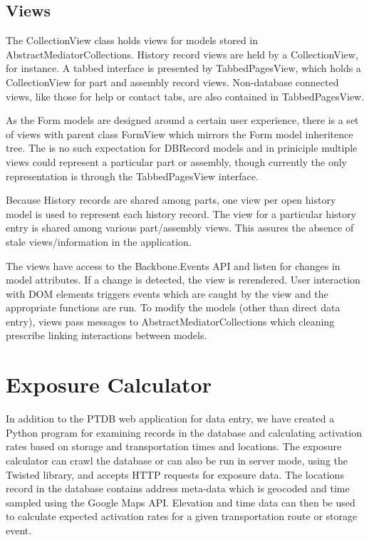 \documentclass[journal]{IEEEtran}
\begin{document}
\subsection{Views}

The CollectionView class holds views for models stored in AbstractMediatorCollections. History record 
views are held by a CollectionView, for instance. A tabbed interface is presented by TabbedPagesView,
which holds a CollectionView for part and assembly record views. Non-database connected views, like those
for help or contact tabs, are also contained in TabbedPagesView.

As the Form models are designed around a certain user experience, there is a set of views with parent class
FormView which mirrors the Form model inheritence tree. The is no such expectation for DBRecord models and
in priniciple multiple views could represent a particular part or assembly, though currently the only representation is
through the TabbedPagesView interface.

Because History records are shared among parts, one view per open history model is used to represent each history
record. The view for a particular history entry is shared among various part/assembly views. This assures the absence of
stale views/information in the application.

The views have access to the Backbone.Events API and listen for changes in model attributes. If a change is detected,
the view is rerendered. User interaction with DOM elements triggers events which are caught by the view and the appropriate
functions are run. To modify the models (other than direct data entry), views pass messages to AbstractMediatorCollections
which cleaning prescribe linking interactions between models.

\section{Exposure Calculator}

In addition to the PTDB web application for data entry, we have created a Python program for
examining records in the database and calculating activation rates based on storage and 
transportation times and locations. The exposure calculator can crawl the database or can
also be run in server mode, using the Twisted library, and accepts HTTP requests for
exposure data. The locations record in the database contains address meta-data which
is geocoded and time sampled using the Google Maps API. Elevation and time data can
then be used to calculate expected activation rates for a given transportation route
or storage event.
\end{document}
